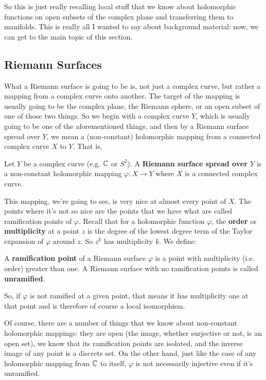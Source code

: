 \documentclass{article}
\begin{document}
So this is just really recalling local stuff that we know about holomorphic functions on open subsets of the complex plane and transferring them to manifolds. This is really all I wanted to say about background material: now, we can get to the main topic of this section.

\subsection{Riemann Surfaces}

What a Riemann surface is going to be is, not just a complex curve, but rather a mapping from a complex curve onto another. The target of the mapping is usually going to be the complex plane, the Riemann sphere, or an open subset of one of those two things. So we begin with a complex curve \(Y\), which is usually going to be one of the aforementioned things, and then by a Riemann surface spread over \(Y\), we mean a (non-constant) holomorphic mapping from a connected complex curve \(X\) to \(Y\). That is,
\begin{definition}
Let \(Y\) be a complex curve (e.g. \(\mathbb{C}\) or \(S^2\)). A \textbf{Riemann surface spread over \(Y\)} is a non-constant holomorphic mapping \(\varphi: X \to Y\) where \(X\) is a connected complex curve.
\end{definition}

This mapping, we're going to see, is very nice at almost every point of \(X\). The points where it's not so nice are the points that we have what are called ramification points of \(\varphi\). Recall that for a holomorphic function \(\varphi\), the \textbf{order} or \textbf{multiplicity} at a point \(z\) is the degree of the lowest degree term of the Taylor expansion of \(\varphi\) around \(z\). So \(z^k\) has multiplicity \(k\). We define:
\begin{definition}
A \textbf{ramification point} of a Riemann surface \(\varphi\) is a point with multiplicity (i.e. order) greater than one. A Riemann surface with no ramification points is called \textbf{unramified}.
\end{definition}
So, if \(\varphi\) is not ramified at a given point, that means it has multiplicity one at that point and is therefore of course a local isomorphism.

Of course, there are a number of things that we know about non-constant holomorphic mappings: they are open (the image, whether surjective or not, is an open set), we know that its ramification points are isolated, and the inverse image of any point is a discrete set. On the other hand, just like the case of any holomorphic mapping from \(\mathbb{C}\) to itself, \(\varphi\) is not necessarily injective even if it's unramified.
\end{document}
